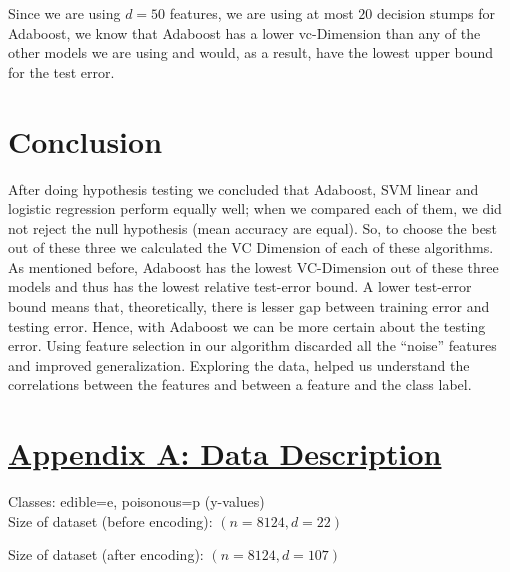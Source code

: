\documentclass[fleqn]{article}
\begin{document}
    Since we are using $d=50$ features, we are using at most $20$ decision stumps for Adaboost,
    we know that Adaboost has a lower vc-Dimension than any of the other models we are using
    and would, as a result, have the lowest upper bound for the test error.

    \section{Conclusion}
    After doing hypothesis testing we concluded that Adaboost, SVM linear and logistic
    regression perform equally well; when we compared each of them, we did not reject the
    null hypothesis (mean accuracy are equal). So, to choose the best out of these three
    we calculated the VC Dimension of each of these algorithms. As mentioned before,
    Adaboost has the lowest VC-Dimension out of these three models and thus has the lowest
    relative test-error bound. A lower test-error bound means that, theoretically, there
    is lesser gap between training error and testing error. Hence, with Adaboost we can be
    more certain about the testing error. Using feature selection in our algorithm
    discarded all the “noise” features and improved generalization. Exploring the data,
    helped us understand the correlations between the features and between a feature and
    the class label.

    \newpage
    \section*{\underline{Appendix A: Data Description}}
    Classes: edible=e, poisonous=p (y-values)\\

    Size of dataset (before encoding): $ (n=8124, d=22) $

    Size of dataset (after encoding): $ (n=8124, d=107) $
\end{document}
